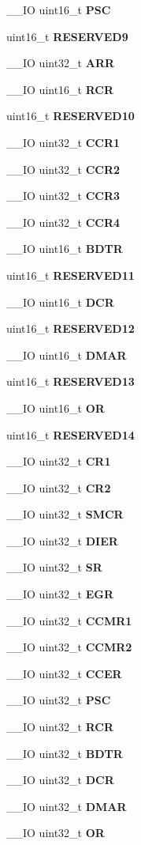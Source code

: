 \begin{DoxyCompactItemize}
\+\_\+\+\_\+\+IO uint16\+\_\+t \textbf{ P\+SC}
\item 
uint16\+\_\+t \textbf{ R\+E\+S\+E\+R\+V\+E\+D9}
\item 
\+\_\+\+\_\+\+IO uint32\+\_\+t \textbf{ A\+RR}
\item 
\+\_\+\+\_\+\+IO uint16\+\_\+t \textbf{ R\+CR}
\item 
uint16\+\_\+t \textbf{ R\+E\+S\+E\+R\+V\+E\+D10}
\item 
\+\_\+\+\_\+\+IO uint32\+\_\+t \textbf{ C\+C\+R1}
\item 
\+\_\+\+\_\+\+IO uint32\+\_\+t \textbf{ C\+C\+R2}
\item 
\+\_\+\+\_\+\+IO uint32\+\_\+t \textbf{ C\+C\+R3}
\item 
\+\_\+\+\_\+\+IO uint32\+\_\+t \textbf{ C\+C\+R4}
\item 
\+\_\+\+\_\+\+IO uint16\+\_\+t \textbf{ B\+D\+TR}
\item 
uint16\+\_\+t \textbf{ R\+E\+S\+E\+R\+V\+E\+D11}
\item 
\+\_\+\+\_\+\+IO uint16\+\_\+t \textbf{ D\+CR}
\item 
uint16\+\_\+t \textbf{ R\+E\+S\+E\+R\+V\+E\+D12}
\item 
\+\_\+\+\_\+\+IO uint16\+\_\+t \textbf{ D\+M\+AR}
\item 
uint16\+\_\+t \textbf{ R\+E\+S\+E\+R\+V\+E\+D13}
\item 
\+\_\+\+\_\+\+IO uint16\+\_\+t \textbf{ OR}
\item 
uint16\+\_\+t \textbf{ R\+E\+S\+E\+R\+V\+E\+D14}
\item 
\+\_\+\+\_\+\+IO uint32\+\_\+t \textbf{ C\+R1}
\item 
\+\_\+\+\_\+\+IO uint32\+\_\+t \textbf{ C\+R2}
\item 
\+\_\+\+\_\+\+IO uint32\+\_\+t \textbf{ S\+M\+CR}
\item 
\+\_\+\+\_\+\+IO uint32\+\_\+t \textbf{ D\+I\+ER}
\item 
\+\_\+\+\_\+\+IO uint32\+\_\+t \textbf{ SR}
\item 
\+\_\+\+\_\+\+IO uint32\+\_\+t \textbf{ E\+GR}
\item 
\+\_\+\+\_\+\+IO uint32\+\_\+t \textbf{ C\+C\+M\+R1}
\item 
\+\_\+\+\_\+\+IO uint32\+\_\+t \textbf{ C\+C\+M\+R2}
\item 
\+\_\+\+\_\+\+IO uint32\+\_\+t \textbf{ C\+C\+ER}
\item 
\+\_\+\+\_\+\+IO uint32\+\_\+t \textbf{ P\+SC}
\item 
\+\_\+\+\_\+\+IO uint32\+\_\+t \textbf{ R\+CR}
\item 
\+\_\+\+\_\+\+IO uint32\+\_\+t \textbf{ B\+D\+TR}
\item 
\+\_\+\+\_\+\+IO uint32\+\_\+t \textbf{ D\+CR}
\item 
\+\_\+\+\_\+\+IO uint32\+\_\+t \textbf{ D\+M\+AR}
\item 
\+\_\+\+\_\+\+IO uint32\+\_\+t \textbf{ OR}
\end{DoxyCompactItemize}


